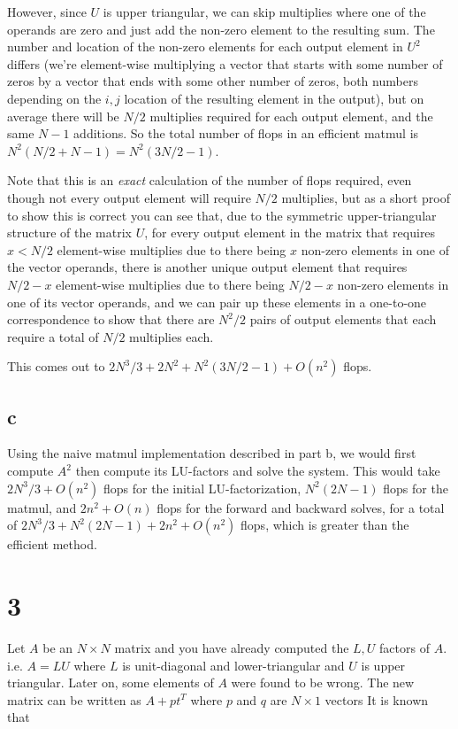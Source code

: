 \documentclass[11pt]{article}
\begin{document}
However, since $U$ is upper triangular, we can skip multiplies where one of the operands are zero and just add the non-zero element to the resulting sum. The number and location of the non-zero elements for each output element in $U^2$ differs (we're element-wise multiplying a vector that starts with some number of zeros by a vector that ends with some other number of zeros, both numbers depending on the $i,j$ location of the resulting element in the output), but on average there will be $N/2$ multiplies required for each output element, and the same $N-1$ additions. So the total number of flops in an efficient matmul is $N^2 (N/2 + N - 1) = N^2 (3N/2 - 1)$.

Note that this is an \textit{exact} calculation of the number of flops required, even though not every output element will require $N/2$ multiplies, but as a short proof to show this is correct you can see that, due to the symmetric upper-triangular structure of the matrix $U$, for every output element in the matrix that requires $x < N/2$ element-wise multiplies due to there being $x$ non-zero elements in one of the vector operands, there is another unique output element that requires $N/2 - x$ element-wise multiplies due to there being $N/2 - x$ non-zero elements in one of its vector operands, and we can pair up these elements in a one-to-one correspondence to show that there are $N^2/2$ pairs of output elements that each require a total of $N/2$ multiplies each.

This comes out to $2N^3/3 + 2N^2 + N^2 (3N/2 - 1) + O(n^2)$ flops.

\subsection{c}

Using the naive matmul implementation described in part b, we would first compute $A^2$ then compute its LU-factors and solve the system. This would take $2N^3/3 + O(n^2)$ flops for the initial LU-factorization, $N^2 (2N - 1)$ flops for the matmul, and $2n^2 + O(n)$ flops for the forward and backward solves, for a total of $2N^3/3 + N^2 (2N - 1) + 2n^2 + O(n^2)$ flops, which is greater than the efficient method.

\section{3}

Let $A$ be an $N \times N$ matrix and you have already computed the $L, U$ factors of $A$. i.e. $A = LU$ where $L$ is unit-diagonal and lower-triangular and $U$ is upper triangular. Later on, some elements of $A$ were found to be wrong. The new matrix can be written as $A + pt^T$ where $p$ and $q$ are $N \times 1$ vectors It is known that
\end{document}
